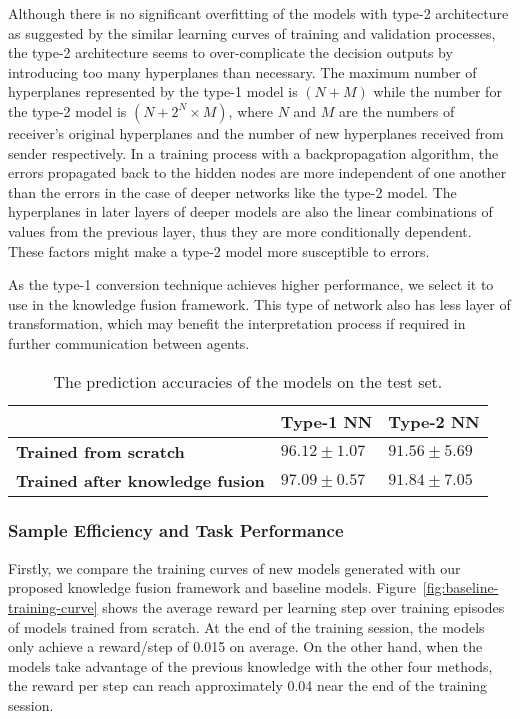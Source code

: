 \documentclass[lettersize,journal]{IEEEtran}
\begin{document}
Although there is no significant overfitting of the models with type-2 architecture as suggested by the similar learning curves of training and validation processes, the type-2 architecture seems to over-complicate the decision outputs by introducing too many hyperplanes than necessary. The maximum number of hyperplanes represented by the type-1 model is $(N + M)$ while the number for the type-2 model is $(N + 2^N\times M)$, where $N$ and $M$ are the numbers of receiver\textquoteright s original hyperplanes and the number of new hyperplanes received from sender respectively. In a training process with a backpropagation algorithm, the errors propagated back to the hidden nodes are more independent of one another than the errors in the case of deeper networks like the type-2 model. The hyperplanes in later layers of deeper models are also the linear combinations of values from the previous layer, thus they are more conditionally dependent. These factors might make a type-2 model more susceptible to errors.

As the type-1 conversion technique achieves higher performance, we select it to use in the knowledge fusion framework. This type of network also has less layer of transformation, which may benefit the interpretation process if required in further communication between agents.

\begin{table}[!b]
\vspace{-1em}
\centering
\small\addtolength{\tabcolsep}{-3pt}
\caption{The prediction accuracies of the models on the test set.}
\label{tab:P3-accuracy}
\begin{tabular}{lll}
                                   & \textbf{Type-1 NN}        & \textbf{Type-2 NN}        \\ \hline
\textbf{Trained from scratch}              & $96.12 \pm 1.07$ & $91.56 \pm 5.69$ \\
\textbf{Trained after knowledge fusion} & $97.09 \pm 0.57$ & $91.84 \pm 7.05$
\end{tabular}
\end{table}

\subsubsection{Sample Efficiency and Task Performance}\label{jpaper2-results-retraining}

Firstly, we compare the training curves of new models generated with our proposed knowledge fusion framework and baseline models. Figure~\ref{fig:baseline-training-curve} shows the average reward per learning step over training episodes of models trained from scratch. At the end of the training session, the models only achieve a reward/step of 0.015 on average. On the other hand, when the models take advantage of the previous knowledge with the other four methods, the reward per step can reach approximately 0.04 near the end of the training session.
\end{document}

